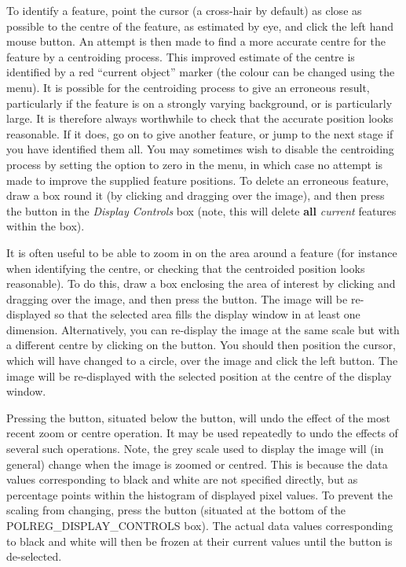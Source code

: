 To identify a feature, point the cursor (a cross-hair by default) as
close as possible to the centre of the feature, as estimated by eye, and
click the left hand mouse button. An attempt is then made to find a more
accurate centre for the feature by a centroiding process. This improved
estimate of the centre is identified by a red ``current object'' marker
(the colour can be changed using the  menu). It is possible for the centroiding
process to give an erroneous result, particularly if the feature is on a
strongly varying background, or is particularly large. It is therefore
always worthwhile to check that the accurate position looks reasonable.
If it does, go on to give another feature, or jump to the next stage if
you have identified them all. You may sometimes wish to disable the
centroiding process by setting the  option to zero in the  menu, in which case no attempt is made to
improve the supplied feature positions. To delete an erroneous feature,
draw a box round it (by clicking and dragging over the image), and then
press the  button in the {\em
Display Controls} box (note, this will delete {\bf all} {\em current}
features within the box).

It is often useful to be able to zoom in on the area around a feature
(for instance when identifying the centre, or checking that the
centroided position looks reasonable). To do this, draw a box enclosing
the area of interest by clicking and dragging over the image, and then
press the  button. The image will be
re-displayed so that the selected area fills the display window in at
least one dimension. Alternatively, you can re-display the image at the
same scale but with a different centre by clicking on the  button. You should then position the cursor,
which will have changed to a circle, over the image and click the
left button. The image will be re-displayed with the selected position at
the centre of the display window.

Pressing the  button, situated below
the  button, will undo the effect of the
most recent zoom or centre operation. It may be used repeatedly to undo
the effects of several such operations. Note, the grey scale used to
display the image will (in general) change when the image is zoomed or
centred. This is because the data values corresponding to black and
white are not specified directly, but as percentage points within the
histogram of displayed pixel values. To prevent the scaling from
changing, press the 
button (situated at the bottom of the 
{POLREG_DISPLAY_CONTROLS} box). The actual data values corresponding to
black and white will then be frozen at their current values until the
button is de-selected.


